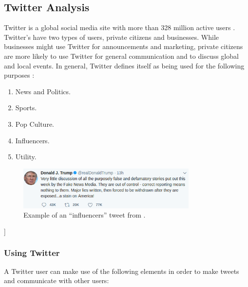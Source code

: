 \subsection{Twitter Analysis}\label{sec:twitter-analysis}
Twitter is a global social media site with more than 328 million active users
\citep{SocialMediaStats}. Twitter's have two types of users, private citizens
and businesses. While businesses might use Twitter for announcements and
marketing, private citizens are more likely to use Twitter for general
communication and to discuss global and local events. In general, Twitter
defines itself as being used for the following purposes \citep{StartingTwitter}:

\begin{enumerate}    
  \item News and Politics.
  \item Sports.
  \item Pop Culture. 
  \item Influencers.
  \item Utility.
\end{enumerate} 

\begin{figure}[H] 
	\centering 
	\includegraphics[width = 0.8\textwidth]{figures/DonDrumpf.png}
	\caption{Example of an ``influencers'' tweet from \@realDonaldTrump.}
	\label{fig:DrumpF}
\end{figure}]

\subsubsection{Using Twitter}
A Twitter user can make use of the following elements \citep{StartingTwitter}
in order to make tweets and communicate with other users:

